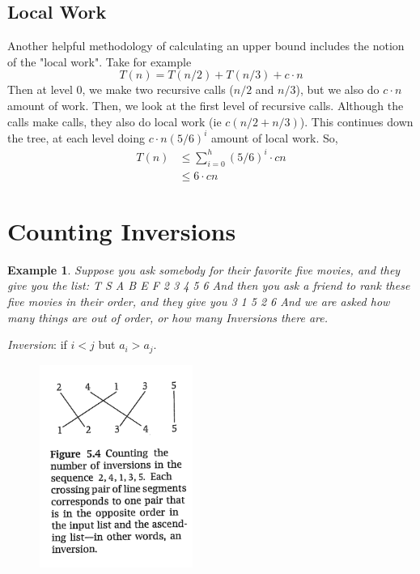 \documentclass[11pt,letterpaper]{article}
\newtheorem{exmp}{Example}
\begin{document}
\subsection*{Local Work}
Another helpful methodology of calculating an upper bound includes the notion of the "local work". Take for example 
\begin{equation*}
	T(n) = T(n/2) + T(n/3) + c \cdot n
\end{equation*}
Then at level 0, we make two recursive calls ($n/2$ and $n/3$), but we also do $c\cdot n$ amount of work. Then, we look at the first level of recursive calls. Although the calls make calls, they also do local work (ie $c(n/2 + n/3)$). This continues down the tree, at each level doing $c\cdot n(5/6)^i$ amount of local work. So, 
\begin{align*}
	T(n) &\leq \sum_{i=0}^h(5/6)^i\cdot c n \\
	&\leq 6\cdot cn
\end{align*}
\section{Counting Inversions}
\begin{exmp}
	Suppose you ask somebody for their favorite five movies, and they give you the list: \newline T  S  A  B  E  F   2  3  4  5  6  \newline
And then you ask a friend to rank these five movies in their order, and they give you
  3  1  5  2  6 \newline
And we are asked how many things are out of order, or how many Inversions there are. 
\end{exmp}
\textit{Inversion}: if $i < j$ but $a_i > a_j$. 
\begin{figure}[ht]
\includegraphics[width=5cm]{InversionCounting}
\end{figure}
\end{document}
